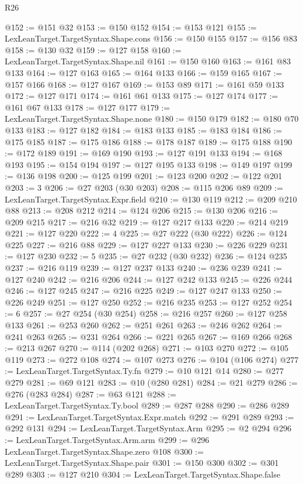 \begin{lexlean}{R26}
\begin{coremodule}
@152 := @151 @32
@153 := @150 @152
@154 := @153 @121
@155 := LexLeanTarget.TargetSyntax.Shape.cons
@156 := @150 @155
@157 := @156 @83
@158 := @130 @32
@159 := @127 @158
@160 := LexLeanTarget.TargetSyntax.Shape.nil
@161 := @150 @160
@163 := @161 @83 @133
@164 := @127 @163
@165 := @164 @133
@166 := @159 @165
@167 := @157 @166
@168 := @127 @167
@169 := @153 @89
@171 := @161 @59 @133
@172 := @127 @171
@174 := @161 @61 @133
@175 := @127 @174
@177 := @161 @67 @133
@178 := @127 @177
@179 := LexLeanTarget.TargetSyntax.Shape.none
@180 := @150 @179
@182 := @180 @70 @133
@183 := @127 @182
@184 := @183 @133
@185 := @183 @184
@186 := @175 @185
@187 := @175 @186
@188 := @178 @187
@189 := @175 @188
@190 := @172 @189
@191 := @169 @190
@193 := @127 @191 @133
@194 := @168 @193
@195 := @154 @194
@197 := @127 @195 @133
@198 := @149 @197
@199 := @136 @198
@200 := @125 @199
@201 := @123 @200
@202 := @122 @201
@203 := 3
@206 := @27 @203 (@30 @203)
@208 := @115 @206 @89
@209 := LexLeanTarget.TargetSyntax.Expr.field
@210 := @130 @119
@212 := @209 @210 @88
@213 := @208 @212
@214 := @124 @206
@215 := @130 @206
@216 := @209 @215
@217 := @216 @32
@219 := @127 @217 @133
@220 := @214 @219
@221 := @127 @220
@222 := 4
@225 := @27 @222 (@30 @222)
@226 := @124 @225
@227 := @216 @88
@229 := @127 @227 @133
@230 := @226 @229
@231 := @127 @230
@232 := 5
@235 := @27 @232 (@30 @232)
@236 := @124 @235
@237 := @216 @119
@239 := @127 @237 @133
@240 := @236 @239
@241 := @127 @240
@242 := @216 @206
@244 := @127 @242 @133
@245 := @226 @244
@246 := @127 @245
@247 := @216 @225
@249 := @127 @247 @133
@250 := @226 @249
@251 := @127 @250
@252 := @216 @235
@253 := @127 @252
@254 := 6
@257 := @27 @254 (@30 @254)
@258 := @216 @257
@260 := @127 @258 @133
@261 := @253 @260
@262 := @251 @261
@263 := @246 @262
@264 := @241 @263
@265 := @231 @264
@266 := @221 @265
@267 := @169 @266
@268 := @213 @267
@270 := @114 (@202 @268)
@271 := @103 @270
@272 := @105 @119
@273 := @272 @108
@274 := @107 @273
@276 := @104 (@106 @274)
@277 := LexLeanTarget.TargetSyntax.Ty.fn
@279 := @10 @121 @14
@280 := @277 @279
@281 := @69 @121
@283 := @10 (@280 @281)
@284 := @21 @279
@286 := @276 (@283 @284)
@287 := @63 @121
@288 := LexLeanTarget.TargetSyntax.Ty.bool
@289 := @287 @288
@290 := @286 @289
@291 := LexLeanTarget.TargetSyntax.Expr.match
@292 := @291 @289
@293 := @292 @131
@294 := LexLeanTarget.TargetSyntax.Arm
@295 := @2 @294
@296 := LexLeanTarget.TargetSyntax.Arm.arm
@299 := @296 LexLeanTarget.TargetSyntax.Shape.zero @108
@300 := LexLeanTarget.TargetSyntax.Shape.pair
@301 := @150 @300
@302 := @301 @289
@303 := @127 @210
@304 := LexLeanTarget.TargetSyntax.Shape.false

\end{coremodule}
\end{lexlean}
